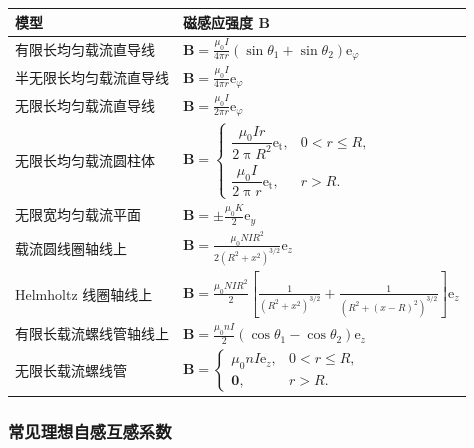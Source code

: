\documentclass[UTF8,fontset=fandol,zihao=5]{ctexart}
\newcommand{\ee}{\mathrm{e}}
\newcommand{\vect}[1]{\bm{#1}}
\begin{document}
\begin{center}
\renewcommand{\arraystretch}{1.8}
\begin{tabularx}{0.99\textwidth}{
    >{\raggedright\arraybackslash}p{3.5cm}
    >{\raggedright\arraybackslash}X
}
\toprule
\textbf{模型} & \textbf{磁感应强度 $\vect B$} \\
\midrule
有限长均匀载流直导线 &
$\displaystyle
\vect B =
\frac{\mu_0 I}{4\pi r}
(\sin\theta_1+\sin\theta_2)
\vect \ee_\varphi
$ \\

半无限长均匀载流直导线 &
$\displaystyle
\vect B =
\frac{\mu_0 I}{4\pi r}
\vect \ee_\varphi
$ \\

无限长均匀载流直导线 &
$\displaystyle
\vect B =
\frac{\mu_0 I}{2\pi r}
\vect \ee_\varphi
$ \\

无限长均匀载流圆柱体 &
$\displaystyle
\vect B =
\begin{cases}
  \dfrac{\mu_0 Ir}{2\uppi R^2}{\ee_\mathrm{t}},&0<r\le R,\\[2pt]
  \dfrac{\mu_0 I}{2\uppi r}\vect {\ee_\mathrm{t}},&r>R.
\end{cases}
$ \\

无限宽均匀载流平面 &
$\displaystyle
\vect B =
\pm\frac{\mu_0 K}{2}\vect \ee_y
$ \\

载流圆线圈轴线上 &
$\displaystyle
\vect B =
\frac{\mu_0 NIR^2}
{2(R^2+x^2)^{3/2}}
\vect \ee_z
$ \\

Helmholtz 线圈轴线上 &
$\displaystyle
\vect B =
\frac{\mu_0 NIR^2}{2}
\left[
\frac{1}{(R^2+x^2)^{3/2}}
+
\frac{1}{(R^2+(x-R)^2)^{3/2}}
\right]\vect \ee_z
$ \\

有限长载流螺线管轴线上 &
$\displaystyle
\vect B =
\frac{\mu_0 nI}{2}
(\cos\theta_1-\cos\theta_2)
\vect \ee_z
$ \\

无限长载流螺线管 &
$\displaystyle
\vect B =
\begin{cases}
  \mu_0 nI\vect \ee_z,&0<r\le R,\\[2pt]
  \vect 0,&r>R.
\end{cases}
$ \\

\bottomrule
\end{tabularx}
\end{center}

\subsubsection{常见理想自感互感系数}
\end{document}
